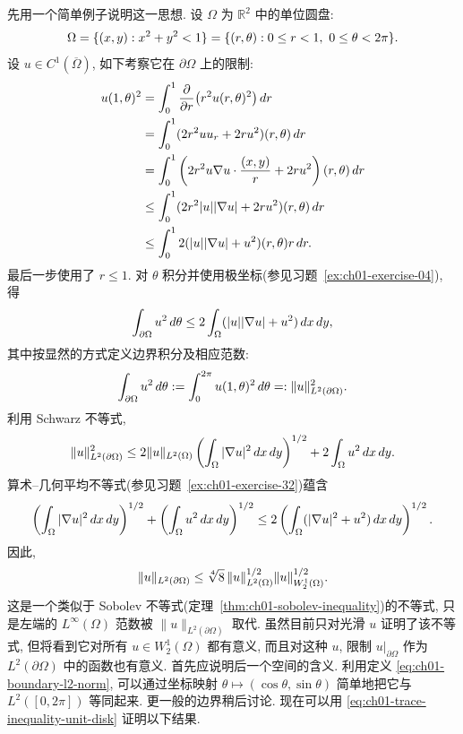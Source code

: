 先用一个简单例子说明这一思想. 设 $\Omega$ 为 $\mathbb R^2$ 中的单位圆盘:
\[
\MathBookFormulaID{formula-ch01-unit-disk}
\Omega=\{(x,y):x^2+y^2<1\}
=\{(r,\theta):0\leq r<1,\ 0\leq\theta<2\pi\}.
\]
设 $u\in C^1(\overline\Omega)$, 如下考察它在 $\partial\Omega$ 上的限制:
\[
\MathBookFormulaID{formula-ch01-unit-disk-trace-derivation}
\begin{aligned}
u(1,\theta)^2
&=\int_0^1\frac{\partial}{\partial r}\bigl(r^2u(r,\theta)^2\bigr)\,dr\\
&=\int_0^1(2r^2uu_r+2ru^2)(r,\theta)\,dr\\
&=\int_0^1\left(2r^2u\nabla u\cdot\frac{(x,y)}r+2ru^2\right)(r,\theta)\,dr\\
&\leq\int_0^1(2r^2|u||\nabla u|+2ru^2)(r,\theta)\,dr\\
&\leq\int_0^1 2(|u||\nabla u|+u^2)(r,\theta)r\,dr.
\end{aligned}
\]
最后一步使用了 $r\leq1$. 对 $\theta$ 积分并使用极坐标(参见习题~\ref{ex:ch01-exercise-04}), 得
\[
\MathBookFormulaID{formula-ch01-boundary-integral-estimate}
\int_{\partial\Omega}u^2\,d\theta
\leq2\int_\Omega(|u||\nabla u|+u^2)\,dx\,dy,
\]
其中按显然的方式定义边界积分及相应范数:
\setcounter{equation}{0}
\begin{equation}
\MathBookFormulaID{formula-ch01-boundary-l2-norm}
\int_{\partial\Omega}u^2\,d\theta
:=\int_0^{2\pi}u(1,\theta)^2\,d\theta
=:\|u\|_{L^2(\partial\Omega)}^2.
\label{eq:ch01-boundary-l2-norm}
\end{equation}
利用 Schwarz 不等式,
\[
\MathBookFormulaID{formula-ch01-boundary-schwarz-estimate}
\|u\|_{L^2(\partial\Omega)}^2
\leq2\|u\|_{L^2(\Omega)}
\left(\int_\Omega|\nabla u|^2\,dx\,dy\right)^{1/2}
+2\int_\Omega u^2\,dx\,dy.
\]
算术--几何平均不等式(参见习题~\ref{ex:ch01-exercise-32})蕴含
\[
\MathBookFormulaID{formula-ch01-trace-agm-estimate}
\left(\int_\Omega|\nabla u|^2\,dx\,dy\right)^{1/2}
+\left(\int_\Omega u^2\,dx\,dy\right)^{1/2}
\leq2\left(\int_\Omega(|\nabla u|^2+u^2)\,dx\,dy\right)^{1/2}.
\]
因此,
\begin{equation}
\MathBookFormulaID{formula-ch01-trace-inequality-unit-disk}
\|u\|_{L^2(\partial\Omega)}
\leq\sqrt[4]{8}\,\|u\|_{L^2(\Omega)}^{1/2}
\|u\|_{W_2^1(\Omega)}^{1/2}.
\label{eq:ch01-trace-inequality-unit-disk}
\end{equation}
这是一个类似于 Sobolev 不等式(定理~\ref{thm:ch01-sobolev-inequality})的不等式, 只是左端的 $L^\infty(\Omega)$ 范数被 $\|u\|_{L^2(\partial\Omega)}$ 取代. 虽然目前只对光滑 $u$ 证明了该不等式, 但将看到它对所有 $u\in W_2^1(\Omega)$ 都有意义, 而且对这种 $u$, 限制 $u|_{\partial\Omega}$ 作为 $L^2(\partial\Omega)$ 中的函数也有意义. 首先应说明后一个空间的含义. 利用定义 \eqref{eq:ch01-boundary-l2-norm}, 可以通过坐标映射 $\theta\mapsto(\cos\theta,\sin\theta)$ 简单地把它与 $L^2([0,2\pi])$ 等同起来. 更一般的边界稍后讨论. 现在可以用 \eqref{eq:ch01-trace-inequality-unit-disk} 证明以下结果.

